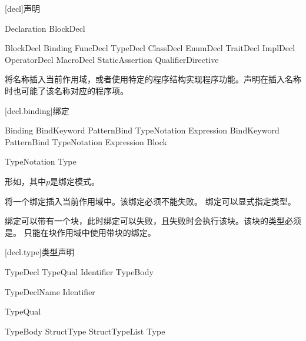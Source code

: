 
[decl]{声明}

\begin{bnf}{Declaration}
    BlockDecl
\end{bnf}

\begin{bnf}{BlockDecl}
    Binding \br
    FuncDecl \br
    TypeDecl \br
    ClassDecl \br
    EnumDecl \br
    TraitDecl \br
    ImplDecl \br
    OperatorDecl \br
    MacroDecl \br
    StaticAssertion \br
    QualifierDirective
\end{bnf}

\pnum
{}将名称插入当前作用域，或者使用特定的程序结构实现程序功能。声明在插入名称时也可能了该名称对应的程序项。

[decl.binding]{绑定}

\begin{bnf}{Binding}
    BindKeyword PatternBind TypeNotation\bnfq \terminal{=} Expression \terminal{;} \br
    BindKeyword PatternBind TypeNotation\bnfq \terminal{=} Expression  Block
\end{bnf}

\begin{bnf}{TypeNotation}
    \terminal{:} Type
\end{bnf}

\pnum
{}形如，其中$p$是绑定模式。

\pnum
{}将一个绑定插入当前作用域中。该绑定必须不能失败。
绑定可以显式指定类型。

\pnum
绑定可以带有一个块，此时绑定可以失败，且失败时会执行该块。该块的类型必须是。
只能在块作用域中使用带块的绑定。

[decl.type]{类型声明}

\begin{bnf}{TypeDecl}
    TypeQual\bnfs {} Identifier TypeBody
\end{bnf}

\begin{bnf}{TypeDeclName}
    Identifier \br
\end{bnf}

\begin{bnf}{TypeQual}
\end{bnf}

\begin{bnf}{TypeBody}
    StructType \br
    \terminal{\{} \terminal{\}} \br
    \terminal{\{} StructTypeList \terminal{,}\bnfq \terminal{\}} \br
    \terminal{=} Type
\end{bnf}

